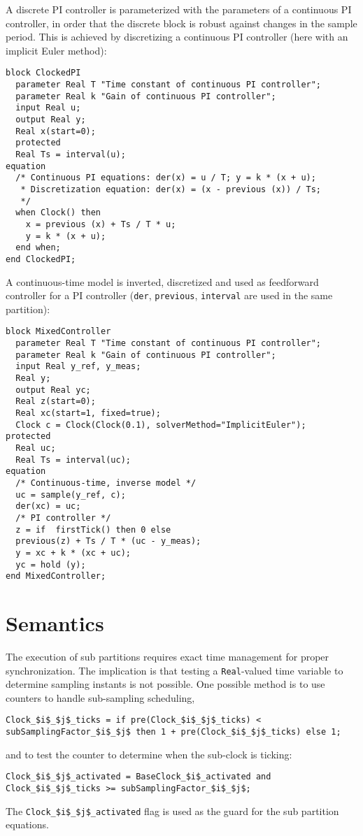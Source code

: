 \begin{example}
A discrete PI controller is parameterized with the parameters of a continuous PI controller, in order that the discrete block is robust against changes in the sample
period.  This is achieved by discretizing a continuous PI controller (here with an implicit Euler method):
\begin{lstlisting}[language=modelica]
block ClockedPI
  parameter Real T "Time constant of continuous PI controller";
  parameter Real k "Gain of continuous PI controller";
  input Real u;
  output Real y;
  Real x(start=0);
  protected
  Real Ts = interval(u);
equation
  /* Continuous PI equations: der(x) = u / T; y = k * (x + u);
   * Discretization equation: der(x) = (x - previous (x)) / Ts;
   */
  when Clock() then
    x = previous (x) + Ts / T * u;
    y = k * (x + u);
  end when;
end ClockedPI;
\end{lstlisting}
A continuous-time model is inverted, discretized and used as feedforward controller for a PI controller (\lstinline!der!, \lstinline!previous!, \lstinline!interval! are used in the same partition):
\begin{lstlisting}[language=modelica]
block MixedController
  parameter Real T "Time constant of continuous PI controller";
  parameter Real k "Gain of continuous PI controller";
  input Real y_ref, y_meas;
  Real y;
  output Real yc;
  Real z(start=0);
  Real xc(start=1, fixed=true);
  Clock c = Clock(Clock(0.1), solverMethod="ImplicitEuler");
protected
  Real uc;
  Real Ts = interval(uc);
equation
  /* Continuous-time, inverse model */
  uc = sample(y_ref, c);
  der(xc) = uc;
  /* PI controller */
  z = if  firstTick() then 0 else
  previous(z) + Ts / T * (uc - y_meas);
  y = xc + k * (xc + uc);
  yc = hold (y);
end MixedController;
\end{lstlisting}
\end{example}

\section{Semantics}\label{semantics}

The execution of sub partitions requires exact time management for proper synchronization.
The implication is that testing a \lstinline!Real!-valued time variable to determine sampling instants is not possible.
One possible method is to use counters to handle sub-sampling scheduling,
\begin{lstlisting}[language=modelica]
Clock_$i$_$j$_ticks = if pre(Clock_$i$_$j$_ticks) < subSamplingFactor_$i$_$j$ then 1 + pre(Clock_$i$_$j$_ticks) else 1;
\end{lstlisting}
and to test the counter to determine when the sub-clock is ticking:
\begin{lstlisting}[language=modelica]
Clock_$i$_$j$_activated = BaseClock_$i$_activated and Clock_$i$_$j$_ticks >= subSamplingFactor_$i$_$j$;
\end{lstlisting}
The \lstinline!Clock_$i$_$j$_activated! flag is used as the guard for the sub
partition equations.


